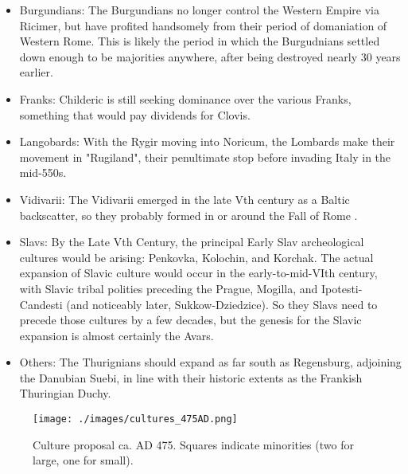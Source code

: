 \documentclass{article}
\begin{document}
\begin{itemize}
		\item Burgundians:\newline
		The Burgundians no longer control the Western Empire via Ricimer, but have profited handsomely from their period of domaniation of Western Rome.
		This is likely the period in which the Burgudnians settled down enough to be majorities anywhere, after being destroyed nearly 30 years earlier.
		
		\item Franks:\newline
		Childeric is still seeking dominance over the various Franks, something that would pay dividends for Clovis.
		
		\item Langobards:\newline
		With the Rygir moving into Noricum, the Lombards make their movement in "Rugiland", their penultimate stop before invading Italy in the mid-550s.
		
		\item Vidivarii:\newline
		The Vidivarii emerged in the late Vth century as a Baltic backscatter, so they probably formed in or around the Fall of Rome \cite{Vidivarii}.
		
		\item Slavs:\newline
		By the Late Vth Century, the principal Early Slav archeological cultures would be arising:  Penkovka, Kolochin, and Korchak.
		The actual expansion of Slavic culture would occur in the early-to-mid-VIth century, with Slavic tribal polities preceding the Prague, Mogilla, and Ipotesti-Candesti (and noticeably later, Sukkow-Dziedzice).
		So they Slavs need to precede those cultures by a few decades, but the genesis for the Slavic expansion is almost certainly the Avars.
		
		\item Others:\newline
		The Thurignians should expand as far south as Regensburg, adjoining the Danubian Suebi, in line with their historic extents as the Frankish Thuringian Duchy.
	\end{itemize}
	
	\newpage
	
	\begin{figure}[h!]
		\centering
		\texttt{[image: ./images/cultures\_475AD.png]}
		\caption{Culture proposal ca. AD 475. Squares indicate minorities (two for large, one for small).}
	\end{figure}
	
\end{document}
